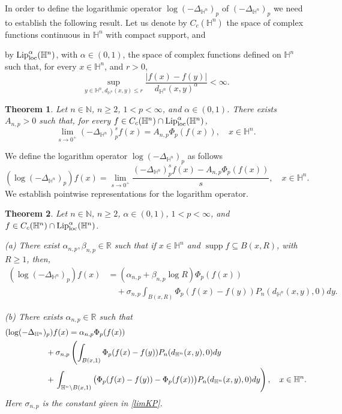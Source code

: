 \documentclass[a4paper,10pt, reqno]{amsart}
\newtheorem{thm}{Theorem}[section]
\theoremstyle{definition}
\theoremstyle{remark}
\newcommand{\supp}{\mathop{\mathrm{supp}}}
\numberwithin{equation}{section}
\begin{document}
In order to define the logarithmic operator $\log (-\Delta_{\mathbb H^n})_p$ of $(-\Delta_{\mathbb H^n})_p$ we need to establish the following result. Let us denote by $C_c(\mathbb H^n)$ the space of complex functions continuous in $\mathbb H^n$ with compact support, and {by ${\rm Lip}_{\rm loc}^\alpha (\mathbb H^n)$, with $\alpha \in (0,1)$, the space of complex functions defined on $\mathbb H^n$ such that, for every $x\in \mathbb H^n$, and $r>0$,
$$
\sup_{y\in \mathbb H^n, d_{\mathbb H^n}(x,y)\leq r}\frac{|f(x)-f(y)|}{d_{\mathbb H^n}(x,y)^\alpha}<\infty.
$$
\begin{thm}\label{Th1.1}
Let $n\in \mathbb N$, $n\geq 2$, $1<p<\infty$, and $\alpha\in (0,1)$. There exists $A_{n,p}>0$ such that, for every $f\in C_c(\mathbb H^n)\cap {\rm Lip}_{\rm loc}^\alpha (\mathbb H^n)$,
$$
\lim_{s\rightarrow 0^+}(-\Delta_{\mathbb H^n})_p^sf(x)=A_{n,p}\Phi _p(f(x)),\quad x\in \mathbb H^n.
$$
\end{thm}
\vspace*{0.2cm}
We define the logarithm operator $\log(-\Delta_{\mathbb H^n})_p$ as follows
$$
(\log(-\Delta_{\mathbb H^n})_p)f(x)=\lim_{s\rightarrow 0^+}\frac{(-\Delta_{\mathbb H^n})_p^sf(x)-A_{n,p}\Phi _p(f(x))}{s},\quad x\in \mathbb H^n.
$$
We establish pointwise representations for the logarithm operator. 

\begin{thm}\label{Th1.2}
Let $n\in \mathbb N$, $n\geq 2$, $\alpha \in (0,1)$, $1<p<\infty$, and $f\in C_c (\mathbb H^n)\cap {\rm Lip}_{\rm loc}^\alpha(\mathbb H^n)$.

(a) There exist $\alpha _{n,p},\beta_{n,p}\in \mathbb R$ such that if $x\in \mathbb H^n$ and $\supp f\subseteq B(x,R)$, with $R\geq 1$, then,
    \begin{align*}
    (\log(-\Delta_{\mathbb H^n})_p)f(x)&=(\alpha _{n,p}+\beta_{n,p}\log R)\Phi _p(f(x))\\
    &\quad +\sigma_{n,p}\int_{B(x,R)}\Phi _p(f(x)-f(y))P_n(d_{\mathbb H^n}(x,y),0)dy.
\end{align*}
   
(b) There exists $\alpha_{n,p}\in \mathbb R$ such that
\begin{align*}
    (\log(-\Delta_{\mathbb H^n})_p)f(x)&=\alpha _{n,p}\Phi _p(f(x))\\
    &\hspace{-1cm}+\sigma_{n,p}\left(\int_{B(x,1)}\Phi _p(f(x)-f(y))P_n(d_{\mathbb H^n}(x,y),0)dy\right.\\
    &\hspace{-1cm}+\left.\int_{\mathbb H^n\setminus B(x,1)}\big(\Phi _p(f(x)-f(y))-\Phi _p(f(x))\big)P_n(d_{\mathbb H^n}(x,y),0)dy\right), \quad x\in \mathbb H^n.
\end{align*}
Here $\sigma _{n,p}$ is the constant given in \eqref{limKP}.
\end{thm}

}
\end{document}
